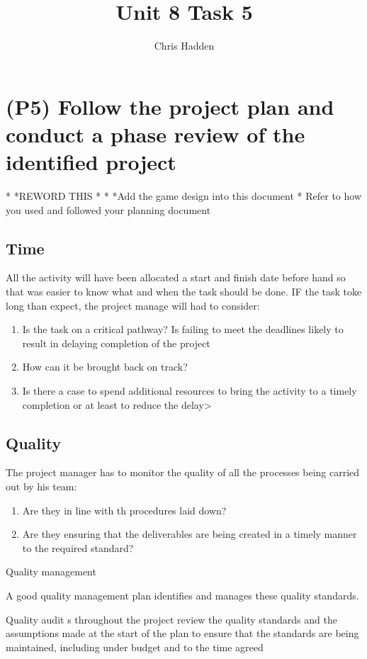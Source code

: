 \documentclass{article}
\begin{document}
\title{Unit 8 Task 5}
\author{Chris Hadden}
\date{}
\maketitle

\section{(P5) Follow the project plan and conduct a phase review of the identified project}
*
*REWORD THIS
*
*
*Add the game design into this document
*
Refer to how you used and followed your planning document
\subsection{Time}
All the activity will have been allocated a start and finish date before hand so that was easier to know what and when the task should be done. IF the task toke long than expect, the project manage will had to consider:
\begin{enumerate}
	\item Is  the task on a critical pathway? Is failing to meet the deadlines likely to result in delaying completion of the project
	\item How can it be brought back on track?
	\item Is there a case to spend additional resources to bring the activity to a timely completion or at least to reduce the delay>
\end{enumerate}

\subsection{Quality}
 The project manager has to monitor the quality of all the processes being carried out by his team:
 \begin{enumerate}
 	\item Are they in line with th procedures laid down?
	\item Are they ensuring that the deliverables are being created in a timely manner to the required standard?
\end{enumerate}

Quality management

A good quality management plan identifies and manages these quality standards.

Quality audit s throughout the project review the quality standards and the assumptions made at the start of the plan to ensure that the standards are being maintained, including under budget and to the time agreed
\end{document}
